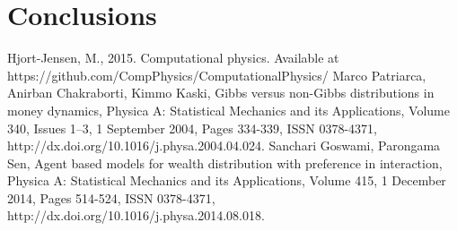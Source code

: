 \documentclass{article}
\begin{document}
\section{Conclusions}
\label{sec:conclusions}

\clearpage

\begin{thebibliography}{1}
 Hjort-Jensen, M., 2015. Computational physics. Available at https://github.com/CompPhysics/ComputationalPhysics/
 Marco Patriarca, Anirban Chakraborti, Kimmo Kaski, Gibbs versus non-Gibbs distributions in money dynamics, Physica A: Statistical Mechanics and its Applications, Volume 340, Issues 1–3, 1 September 2004, Pages 334-339, ISSN 0378-4371, http://dx.doi.org/10.1016/j.physa.2004.04.024.
 Sanchari Goswami, Parongama Sen, Agent based models for wealth distribution with preference in interaction, Physica A: Statistical Mechanics and its Applications, Volume 415, 1 December 2014, Pages 514-524, ISSN 0378-4371, http://dx.doi.org/10.1016/j.physa.2014.08.018.
\end{thebibliography}
\end{document}
